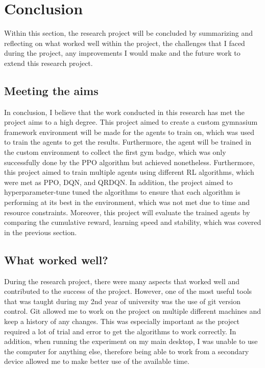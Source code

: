 \section{Conclusion}

Within this section, the research project will be concluded by summarizing and reflecting on what worked well within the project, the challenges that I faced during the project, any improvements I would make and the future work to extend this research project.

\subsection{Meeting the aims}

In conclusion, I believe that the work conducted in this research has met the project aims to a high degree. This project aimed to create a custom gymnasium framework environment will be made for the agents to train on, which was used to train the agents to get the results. Furthermore, the agent will be trained in the custom environment to collect the first gym badge, which was only successfully done by the PPO algorithm but achieved nonetheless. Furthermore, this project aimed to train multiple agents using different RL algorithms, which were met as PPO, DQN, and QRDQN. In addition, the project aimed to hyperparameter-tune tuned the algorithms to ensure that each algorithm is performing at its best in the environment, which was not met due to time and resource constraints. Moreover, this project will evaluate the trained agents by comparing the cumulative reward, learning speed and stability, which was covered in the previous section. 

\subsection{What worked well?}

During the research project, there were many aspects that worked well and contributed to the success of the project. However, one of the most useful tools that was taught during my 2nd year of university was the use of git version control. Git allowed me to work on the project on multiple different machines and keep a history of any changes. This was especially important as the project required a lot of trial and error to get the algorithms to work correctly. In addition, when running the experiment on my main desktop, I was unable to use the computer for anything else, therefore being able to work from a secondary device allowed me to make better use of the available time.  


